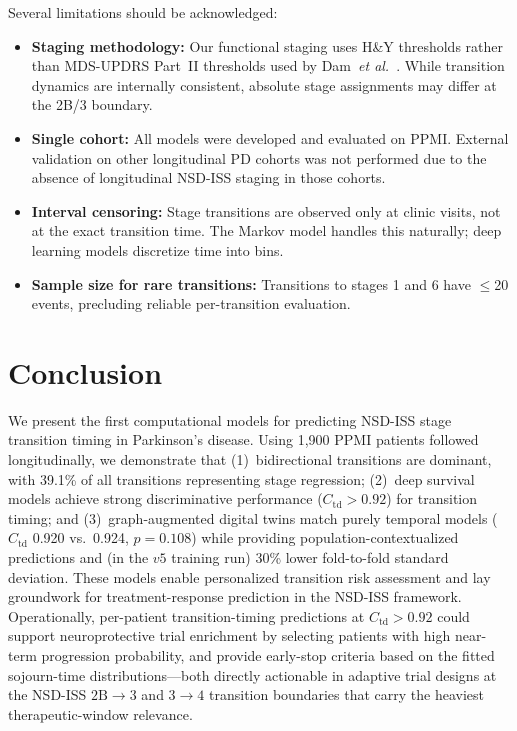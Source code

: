 Several limitations should be acknowledged:
\begin{itemize}
    \item \textbf{Staging methodology:} Our functional staging uses H\&Y thresholds rather than MDS-UPDRS Part~II thresholds used by Dam~\textit{et al.}~\cite{dam2024}. While transition dynamics are internally consistent, absolute stage assignments may differ at the 2B/3 boundary.
    \item \textbf{Single cohort:} All models were developed and evaluated on PPMI. External validation on other longitudinal PD cohorts was not performed due to the absence of longitudinal NSD-ISS staging in those cohorts.
    \item \textbf{Interval censoring:} Stage transitions are observed only at clinic visits, not at the exact transition time. The Markov model handles this naturally; deep learning models discretize time into bins.
    \item \textbf{Sample size for rare transitions:} Transitions to stages 1 and 6 have $\leq$20 events, precluding reliable per-transition evaluation.
\end{itemize}

\section{Conclusion}
\label{p3:sec:conclusion}

We present the first computational models for predicting NSD-ISS stage transition timing in Parkinson's disease. Using 1,900 PPMI patients followed longitudinally, we demonstrate that (1)~bidirectional transitions are dominant, with 39.1\% of all transitions representing stage regression; (2)~deep survival models achieve strong discriminative performance ($C_\text{td} > 0.92$) for transition timing; and (3)~graph-augmented digital twins match purely temporal models ($C_\text{td}$ 0.920 vs.\ 0.924, $p{=}0.108$) while providing population-contextualized predictions and (in the $v5$ training run) 30\% lower fold-to-fold standard deviation. These models enable personalized transition risk assessment and lay groundwork for treatment-response prediction in the NSD-ISS framework. Operationally, per-patient transition-timing predictions at $C_\text{td} > 0.92$ could support neuroprotective trial enrichment by selecting patients with high near-term progression probability, and provide early-stop criteria based on the fitted sojourn-time distributions---both directly actionable in adaptive trial designs at the NSD-ISS $2\text{B} \to 3$ and $3 \to 4$ transition boundaries that carry the heaviest therapeutic-window relevance.
